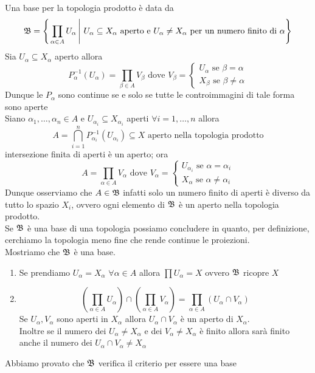 \begin{prop}Una base per la topologia prodotto \`e data da 
$$\mathfrak{B}=\left\{ \left. \prod_{\alpha\in A} U_\alpha \, \right \vert \, U_\alpha\subseteq X_\alpha \text{ aperto e } U_\alpha \neq X_\alpha \text{ per un numero finito di } \alpha \right\}$$
\proof Sia $U_\alpha \subseteq X_\alpha $ aperto allora
$$ P_\alpha^{-1} (U_\alpha)= \prod_{\beta \in A } V_\beta  \text{ dove } V_\beta = \begin{cases} U_\alpha \text{ se } \beta= \alpha\\ X_\beta \text{ se } \beta \neq \alpha \end{cases} $$
Dunque le $P_\alpha$ sono continue se e solo se tutte le controimmagini di tale forma sono aperte \\
Siano $\alpha_1, \dots, \alpha_n\in A$ e $U_{\alpha_i} \subseteq X_{\alpha_i} $ aperti $\forall i=1,\dots, n $ allora
$$ A=\bigcap_{i=1}^n P_{\alpha_i}^{-1}(U_{\alpha_i} ) \subseteq X \text{ aperto nella topologia prodotto} $$
intersezione finita di aperti \`e un aperto; ora 
$$ A=\prod_{\alpha \in A } V_\alpha \text{ dove } V_\alpha = \begin{cases}
U_{\alpha_i} \text{ se } \alpha=\alpha_i \\ X_\alpha \text{ se } \alpha\neq \alpha_i \end{cases}$$
Dunque osserviamo che  $A\in \mathfrak{B}$ infatti solo un numero finito di aperti \`e diverso da tutto lo spazio $X_i$, ovvero ogni elemento di $\mathfrak{B}$ \`e un aperto nella topologia prodotto.\\
Se $\mathfrak{B}$ \`e una base di una topologia possiamo concludere in quanto, per definizione, cerchiamo la topologia meno fine che rende continue le proiezioni.\\
Mostriamo che $\mathfrak{B}$ \`e una base.\begin{enumerate}
\item Se prendiamo $U_\alpha=X_\alpha $ $\forall \alpha\in A $ allora $\prod U_\alpha=X$ ovvero $\mathfrak{B}$ ricopre $X$
\item  
$$ \left( \prod_{\alpha \in A} U_\alpha \right) \cap  \left( \prod_{\alpha \in A} V_\alpha \right)=   \prod_{\alpha \in A} (U_\alpha \cap V_\alpha)$$
Se $U_\alpha , V_\alpha$ sono aperti in $X_\alpha$ allora $U_\alpha \cap V_\alpha$ \`e un aperto di $X_\alpha$.\\
Inoltre se il numero dei $U_\alpha \neq X_\alpha $ e dei $V_\alpha \neq X_\alpha$ \`e finito allora sar\`a finito anche il numero dei $U_\alpha \cap V_\alpha \neq X_\alpha$
\end{enumerate}
Abbiamo provato che $\mathfrak{B}$ verifica il criterio per essere una base 
\endproof
\end{prop}
